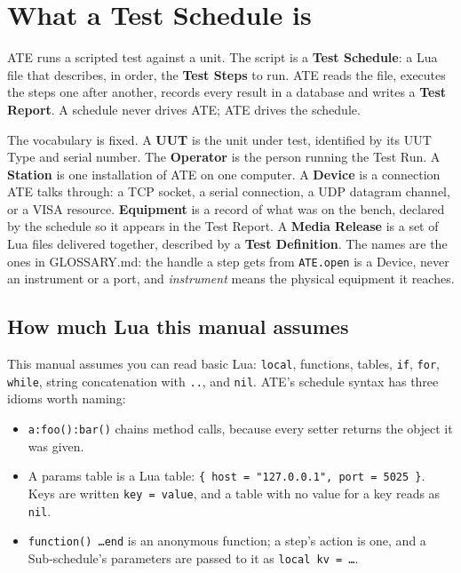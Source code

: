 \chapter{What a Test Schedule is}\label{ch:what-a-schedule-is}

ATE runs a scripted test against a unit. The script is a \textbf{Test Schedule}: a Lua file
that describes, in order, the \textbf{Test Steps} to run. ATE reads the file, executes the
steps one after another, records every result in a database and writes a \textbf{Test Report}.
A schedule never drives ATE; ATE drives the schedule.

The vocabulary is fixed. A \textbf{UUT} is the unit under test, identified by its UUT Type and
serial number. The \textbf{Operator} is the person running the Test Run. A \textbf{Station} is
one installation of ATE on one computer. A \textbf{Device} is a connection ATE talks through:
a TCP socket, a serial connection, a UDP datagram channel, or a VISA resource.
\textbf{Equipment} is a record of what was on the bench, declared by the schedule so it appears
in the Test Report. A \textbf{Media Release} is a set of Lua files delivered together, described
by a \textbf{Test Definition}. The names are the ones in GLOSSARY.md: the handle a step gets from
\texttt{ATE.open} is a Device, never an instrument or a port, and \emph{instrument} means the
physical equipment it reaches.

\section{How much Lua this manual assumes}

This manual assumes you can read basic Lua: \texttt{local}, functions, tables, \texttt{if},
\texttt{for}, \texttt{while}, string concatenation with \texttt{..}, and \texttt{nil}. ATE's
schedule syntax has three idioms worth naming:

\begin{itemize}
  \item \texttt{a:foo():bar()} chains method calls, because every setter returns the object it
    was given.
  \item A params table is a Lua table: \texttt{\{ host = "127.0.0.1", port = 5025 \}}. Keys are
    written \texttt{key = value}, and a table with no value for a key reads as \texttt{nil}.
  \item \texttt{function() \dots end} is an anonymous function; a step's action is one, and a
    Sub-schedule's parameters are passed to it as \texttt{local kv = \dots}.
\end{itemize}

